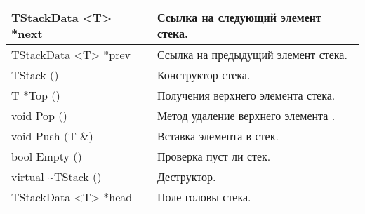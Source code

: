 \documentclass[pdf, unicode, 12pt, a4paper,oneside,fleqn]{article}
\begin{document}
\begin{longtable}{|p{8.4cm}|p{7.5cm}|}
\hline TStackData <T> *next&Ссылка на следующий элемент стека.\\ \hline
\hline TStackData <T> *prev&Ссылка на предыдущий элемент стека.\\ \hline
\hline TStack ()&Конструктор стека.\\ \hline
\hline T *Top ()&Получения верхнего элемента стека.\\ \hline
\hline void Pop ()&Метод удаление верхнего элемента .\\ \hline
\hline void Push (T \&)& Вставка элемента в стек.\\ \hline
\hline bool Empty ()&Проверка пуст ли стек.\\ \hline
\hline virtual \textasciitilde TStack ()& Деструктор.\\ \hline
\hline TStackData <T> *head& Поле головы стека.\\ \hline
\end{longtable}

\newpage
\end{document}

